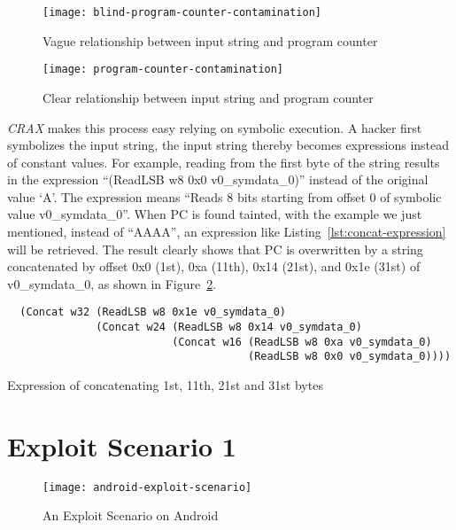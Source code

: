 \begin{figure}[!ht]
  \texttt{[image: blind-program-counter-contamination]}
  \caption{Vague relationship between input string and program counter}
  \label{fig:blind-program-counter-contamination}
\end{figure}

\begin{figure}[!ht]
  \texttt{[image: program-counter-contamination]}
  \caption{Clear relationship between input string and program counter}
  \label{fig:program-counter-contamination}
\end{figure}

\emph{CRAX} makes this process easy relying on symbolic execution. A hacker
first symbolizes the input string, the input string thereby becomes expressions
instead of constant values. For example, reading from the first byte of the
string results in the expression ``(ReadLSB w8 0x0 v0\_symdata\_0)'' instead of
the original value `A'. The expression means ``Reads 8 bits starting from
offset 0 of symbolic value v0\_symdata\_0''. When PC is found tainted, with the
example we just mentioned, instead of ``AAAA'', an expression like
Listing~\ref{lst:concat-expression} will be retrieved. The result clearly shows
that PC is overwritten by a string concatenated by offset 0x0 (1st),
0xa (11th), 0x14 (21st), and 0x1e (31st) of v0\_symdata\_0, as shown in
Figure~\ref{fig:program-counter-contamination}.

\begin{listing}[H]
  \begin{verbatim}
  (Concat w32 (ReadLSB w8 0x1e v0_symdata_0)
              (Concat w24 (ReadLSB w8 0x14 v0_symdata_0)
                          (Concat w16 (ReadLSB w8 0xa v0_symdata_0)
                                      (ReadLSB w8 0x0 v0_symdata_0))))
  \end{verbatim}
  \caption{Expression of concatenating 1st, 11th, 21st and 31st bytes}
  \label{lst:concat-expression}
\end{listing}

\section{Exploit Scenario 1}

\begin{figure}[!ht]
  \texttt{[image: android-exploit-scenario]}
  \caption{An Exploit Scenario on Android}
  \label{fig:android-exploit-scenario}
\end{figure}


